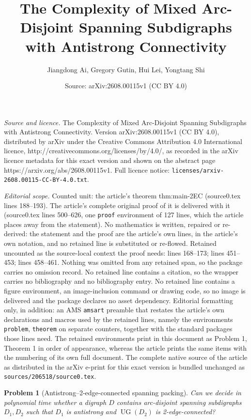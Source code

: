 \documentclass[10pt,a4paper]{amsart}
\title{The Complexity of Mixed Arc-Disjoint Spanning Subdigraphs with Antistrong Connectivity}
\author{Jiangdong Ai, Gregory Gutin, Hui Lei, Yongtang Shi}
\date{Source: arXiv:2608.00115v1 (CC BY 4.0)}
\newtheorem{problem}{Problem}
\newcommand{\UG}{\operatorname{UG}}
\begin{document}
\maketitle

\noindent\emph{Source and licence.} The Complexity of Mixed Arc-Disjoint Spanning Subdigraphs with Antistrong Connectivity. Version arXiv:2608.00115v1 (CC BY 4.0), distributed by arXiv under the Creative Commons Attribution 4.0 International licence, http://creativecommons.org/licenses/by/4.0/, as recorded in the arXiv licence metadata for this exact version and shown on the abstract page https://arxiv.org/abs/2608.00115v1. Full licence notice: \texttt{licenses/arxiv-2608.00115-CC-BY-4.0.txt}.\par\smallskip

\noindent\textit{Editorial scope.} Counted unit: the article's theorem thm:main-2EC (source0.tex lines 188--193). The article's complete original proof of it is delivered with it (source0.tex lines 500--626, one \texttt{proof} environment of 127 lines, which the article places away from the statement). No mathematics is written, repaired or re-derived: the statement and the proof are the article's own lines, in the article's own notation, and no retained line is substituted or re-flowed.  Retained uncounted as the source-local context the proof needs: lines 168--173; lines 451--453; lines 458--461.  Nothing was omitted from any retained span, so the package carries no omission record.  No retained line contains a citation, so the wrapper carries no bibliography and no bibliography entry.  No retained line contains a figure environment, an image-inclusion command or drawing code, so no image is delivered and the package declares no asset dependency.  Editorial formatting only, in addition: an AMS \texttt{amsart} preamble that restates the article's own declarations and macros used by the retained lines, namely the environments \texttt{problem}, \texttt{theorem} on separate counters, together with the standard packages those lines need.  The retained environments print in this document as Problem 1, Theorem 1 in order of appearance, whereas the article prints the same items with the numbering of its own full document.  The complete native source of the article as distributed in the arXiv e-print for this exact version is bundled unchanged as \texttt{sources/206518/source0.tex}.
\begin{problem}[Antistrong--2-edge-connected spanning packing]
\label{prob:AS-2EC}
Can we decide in polynomial time whether a digraph $D$ contains arc-disjoint spanning
subdigraphs $D_1,D_2$ such that $D_1$ is antistrong and
$\UG(D_2)$ is 2-edge-connected?
\end{problem}
\end{document}
